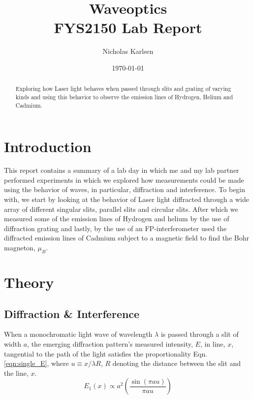 \documentclass[11pt,a4paper]{article}
\begin{document}
\title{Waveoptics\\
\normalsize{FYS2150 Lab Report}}

\author{Nicholas Karlsen}

\date{\today}%

\maketitle

\begin{abstract}
  Exploring how Laser light behaves when passed through slits and grating of varying kinds and using this behavior to observe the emission lines of Hydrogen, Helium and Cadmium.
\end{abstract}


\section{\label{sect:intro}Introduction}
  This report contains a summary of a lab day in which me and my lab partner performed experiments in which we explored how measurements could be made using the behavior of waves, in particular, diffraction and interference.
  To begin with, we start by looking at the behavior of Laser light diffracted through a wide array of different singular slits, parallel slits and circular slits. After which we measured some of the emission lines of Hydrogen and helium by the use of diffraction grating and lastly, by the use of an FP-interferometer used the diffracted emission lines of Cadmium subject to a magnetic field to find the Bohr magneton, $\mu_B$.

\section{\label{sect:theory}Theory}
  \subsection{Diffraction \& Interference}
    When a monochromatic light wave of wavelength $\lambda$ is passed through a slit of width $a$, the emerging diffraction pattern's measured intensity, $E$, in line, $x$, tangential to the path of the light satisfies the proportionality Eqn. \ref{eqn:single_E}, where $u \equiv x / \lambda R$, $R$ denoting the distance between the slit and the line, $x$.
    \begin{equation}
      E_1(x) \propto a^2 \left( \frac{\sin(\pi a u)}{\pi a u} \right)
      \label{eqn:single_E}
    \end{equation}
\end{document}

